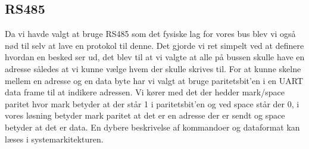 \subsection{RS485}
Da vi havde valgt at bruge RS485 som det fysiske lag for vores bus blev vi også nød til selv at lave en protokol til denne. Det gjorde vi ret simpelt ved at definere hvordan en besked ser ud, det blev til at vi valgte at alle på bussen skulle have en adresse således at vi kunne vælge hvem der skulle skrives til. For at kunne skelne mellem en adresse og en data byte har vi valgt at bruge paritetsbit'en i en UART data frame til at indikere adressen. Vi kører med det der hedder mark/space paritet hvor mark betyder at der står 1 i paritetsbit'en og ved space står der 0, i vores løsning betyder mark paritet at det er en adresse der er sendt og space betyder at det er data. En dybere beskrivelse af kommandoer og dataformat kan læses i systemarkitekturen.